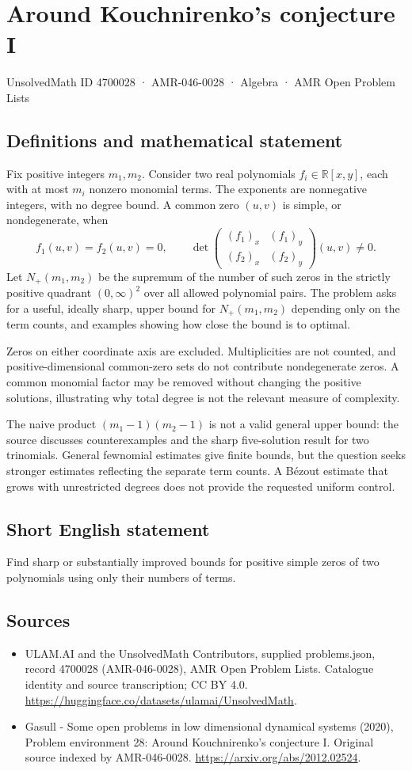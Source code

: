 \documentclass[11pt,a4paper]{article}
\begin{document}
\section*{Around Kouchnirenko's conjecture I}\label{4700028}
{\small UnsolvedMath ID 4700028 · AMR-046-0028 · Algebra · AMR Open Problem Lists}
\subsection{Definitions and mathematical statement}
Fix positive integers $m_1,m_2$. Consider two real polynomials
$f_i\in\mathbb R[x,y]$, each with at most $m_i$ nonzero monomial terms.
The exponents are nonnegative integers, with no degree bound. A common
zero $(u,v)$ is simple, or nondegenerate, when
\[
 f_1(u,v)=f_2(u,v)=0,\qquad
 \det\begin{pmatrix}(f_1)_x&(f_1)_y\\(f_2)_x&(f_2)_y\end{pmatrix}(u,v)\ne0.
\]
Let $N_+(m_1,m_2)$ be the supremum of the number of such zeros in the
strictly positive quadrant $(0,\infty)^2$ over all allowed polynomial pairs.
The problem asks for a useful, ideally sharp, upper bound for
$N_+(m_1,m_2)$ depending only on the term counts, and examples showing how
close the bound is to optimal.

Zeros on either coordinate axis are excluded. Multiplicities are not
counted, and positive-dimensional common-zero sets do not contribute
nondegenerate zeros. A common monomial factor may be removed without
changing the positive solutions, illustrating why total degree is not
the relevant measure of complexity.

The naive product $(m_1-1)(m_2-1)$ is not a valid general upper bound:
the source discusses counterexamples and the sharp five-solution result
for two trinomials. General fewnomial estimates give finite bounds, but
the question seeks stronger estimates reflecting the separate term
counts. A Bézout estimate that grows with unrestricted degrees does not
provide the requested uniform control.
\subsection{Short English statement}
Find sharp or substantially improved bounds for positive simple zeros of two polynomials using only their numbers of terms.
\subsection{Sources}
\begin{itemize}
\item[S1] ULAM.AI and the UnsolvedMath Contributors, supplied problems.json, record 4700028 (AMR-046-0028), AMR Open Problem Lists. Catalogue identity and source transcription; CC BY 4.0.
\url{https://huggingface.co/datasets/ulamai/UnsolvedMath}.
\item[S2] Gasull - Some open problems in low dimensional dynamical systems (2020), Problem environment 28: Around Kouchnirenko's conjecture I. Original source indexed by AMR-046-0028.
\url{https://arxiv.org/abs/2012.02524}.
\end{itemize}
\end{document}
